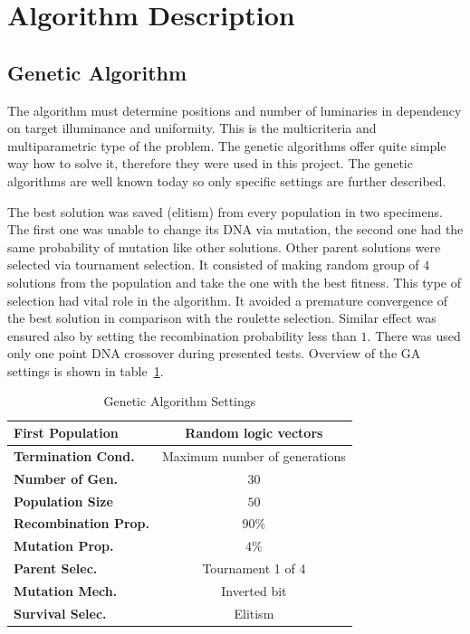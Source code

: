 \section{Algorithm Description}
\subsection{Genetic Algorithm}
\label{ssec:GenAlg}
The algorithm must determine positions and number of luminaries in dependency on target illuminance and uniformity. This is the multicriteria and multiparametric type of the problem. The genetic algorithms offer quite simple way how to solve it, therefore they were used in this project. The genetic algorithms are well known today so only specific settings are further described.

The best solution was saved (elitism) from every population in two specimens. The first one was unable to change its DNA via mutation, the second one had the same probability of mutation like other solutions. Other parent solutions were selected via tournament selection. It consisted of making random group of $4$ solutions from the population and take the one with the best fitness. This type of selection had vital role in the algorithm. It avoided a premature convergence of the best solution in comparison with the roulette selection. Similar effect was ensured also by setting the recombination probability less than $1$. There was used only one point DNA crossover during presented tests. Overview of the GA settings is shown in table~\ref{tab:GAsettings}.

\begin{table}[htb]
	\renewcommand{\arraystretch}{1.3}
	\caption{Genetic Algorithm Settings}
 	\label{tab:GAsettings}
	\centering
  \begin{tabular}{| l | c |}
    \hline
    \textbf{First Population} & Random logic vectors \\
    \hline
    \textbf{Termination Cond.} & Maximum number of generations \\
    \hline
		\textbf{Number of Gen.} & $30$ \\
    \hline
		\textbf{Population Size} & $50$ \\
    \hline
		\textbf{Recombination Prop.} & $90 \%$ \\
    \hline
		\textbf{Mutation Prop.} & $4 \%$ \\
    \hline
		\textbf{Parent Selec.} & Tournament 1 of 4 \\
    \hline
		\textbf{Mutation Mech.} & Inverted bit \\
    \hline
		\textbf{Survival Selec.} & Elitism \\
    \hline
  \end{tabular}
\end{table}

